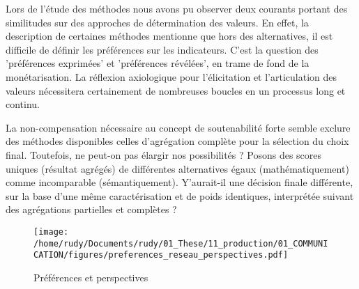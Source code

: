 
Lors de l'étude des méthodes nous avons pu observer deux courants portant des similitudes sur des approches de détermination des valeurs.
En effet, la description de certaines méthodes mentionne que hors des alternatives, il est difficile de définir les préférences sur les indicateurs.
C'est la question des 'préférences exprimées' et 'préférences révélées', en trame de fond de la monétarisation.
La réflexion axiologique pour l'élicitation et l'articulation des valeurs nécessitera certainement de nombreuses boucles en un processus long et continu.


La non-compensation nécessaire au concept de soutenabilité forte semble exclure des méthodes disponibles celles d'agrégation complète pour la sélection du choix final.
Toutefois, ne peut-on pas élargir nos possibilités ?
Posons des scores uniques (résultat agrégés) de différentes alternatives égaux (mathématiquement) comme incomparable (sémantiquement).
Y'aurait-il une décision finale différente, sur la base d'une même caractérisation et de poids identiques, interprétée suivant des agrégations partielles et complètes ?
\begin{figure}[htbp]
\centering
	\caption{Préférences et perspectives}
	\texttt{[image: /home/rudy/Documents/rudy/01\_These/11\_production/01\_COMMUNICATION/figures/preferences\_reseau\_perspectives.pdf]}
	\label{fig:preferences_perspectives}
\end{figure}




